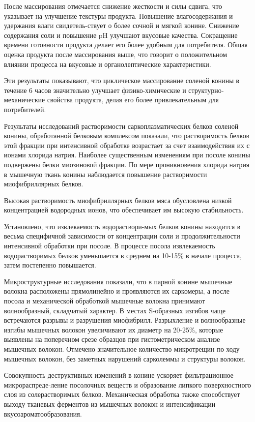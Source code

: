 \begin{multicols}{2}

После массирования отмечается снижение жесткости и силы сдвига, что
указывает на улучшение текстуры продукта. Повышение влагосодержания и
удержания влаги свидетель-ствует о более сочной и мягкой конине. Снижение
содержания соли и повышение pH улучшают вкусовые качества. Сокращение
времени готовности продукта делает его более удобным для потребителя.
Общая оценка продукта после массирования выше, что говорит о
положительном влиянии процесса на вкусовые и органолептические
характеристики.

Эти результаты показывают, что циклическое массирование соленой конины в
течение 6 часов значительно улучшает физико-химические и
структурно-механические свойства продукта, делая его более
привлекательным для потребителей.

Результаты исследований растворимости саркоплазматических белков соленой
конины, обработанной белковым комплексом показали, что растворимость
белков этой фракции при интенсивной обработке возрастает за счет
взаимодействия их с ионами хлорида натрия. Наиболее существенным
изменениям при посоле конины подвержены белки миозиновой фракции. По
мере проникновения хлорида натрия в мышечную ткань конины наблюдается
повышение растворимости миофибриллярных белков.

Высокая растворимость миофибриллярных белков мяса обусловлена низкой
концентрацией водородных ионов, что обеспечивает им высокую
стабильность.

Установлено, что извлекаемость водораствори-мых белков конины находится в
весьма специфичной зависимости от концентрации соли и продолжительности
интенсивной обработки при посоле. В процессе посола извлекаемость
водорастворимых белков уменьшается в среднем на 10-15\% в начале
процесса, затем постепенно повышается.

Микроструктурные исследования показали, что в парной конине мышечные
волокна расположены прямолинейно и проявляются их саркомеры, а после
посола и механической обработкой мышечные волокна принимают
волнообразный, складчатый характер. В местах S-образных изгибов чаще
встречаются разрывы и разрушения миофибрилл. Разрыхление и волнообразные
изгибы мышечных волокон увеличивают их диаметр на 20-25\%, которые
выявлены на поперечном срезе образцов при гистометрическом анализе
мышечных волокон. Отмечено значительное количество микротрещин по ходу
мышечных волокон, без заметных нарушений сарколеммы и структуры волокон.

Совокупность деструктивных изменений в конине ускоряет фильтрационное
микрораспреде-ление посолочных веществ и образование липкого
поверхностного слоя из солерастворимых белков. Механическая обработка
также способствует выходу тканевых ферментов из мышечных волокон и
интенсификации вкусоароматообразования.


\end{multicols}
